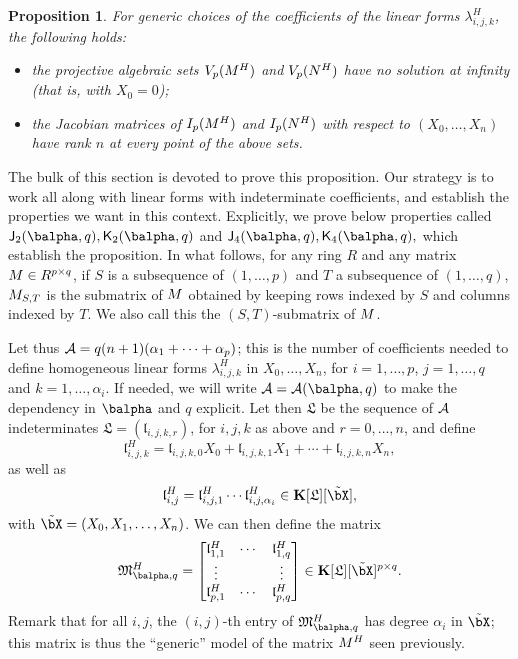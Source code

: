 \documentclass[12pt]{article}
\newtheorem{proposition}[definition]{Proposition}
\begin{document}
\begin{proposition}\label{lemma:appendix}
  For generic choices of the coefficients of the linear forms
  $\lambda^H_{i,j,k}$, the following holds:
  \begin{itemize}
  \item the projective algebraic sets $V_p({M}^H)$ and $V_p({N}^H)$
    have no solution at infinity (that is, with $X_0=0$);
  \item the Jacobian matrices of $I_p({M}^H)$ and $I_p({N}^H)$ with
    respect to $(X_0,\dots,X_n)$ have rank $n$ at every point of the
    above sets.
\end{itemize}
\end{proposition}

The bulk of this section is devoted to prove this proposition.
Our strategy is to work all along with linear forms with indeterminate
coefficients, and establish the properties we want in this context.
Explicitly, we prove below properties called $\assI_2(\balpha,q),\assJ_2(\balpha,q)$
and  $\assI_4(\balpha,q),\assJ_4(\balpha,q),$ which establish the proposition.
In what follows, for any ring $R$ and any matrix ${M} \in R^{p\times
  q}$, if $S$ is a subsequence of $(1,\dots,p)$ and $T$ a subsequence
of $(1,\dots,q)$, ${M}_{S,T}$ is the submatrix of ${M}$ obtained by keeping
rows indexed by $S$ and columns indexed by $T$. We also call this the
$(S,T)$-submatrix of ${M}$.


Let thus ${\cal A}=q(n+1)(\alpha_1 + \cdots + \alpha_p)$; this is the
number of coefficients needed to define homogeneous linear forms
$\lambda^H_{i,j,k}$ in $X_0,\dots,X_n$, for $i=1,\dots,p$,
$j=1,\dots,q$ and $k=1,\dots,\alpha_i$. If needed, we will write
${\cal A}={\cal A}(\balpha,q)$ to make the dependency in $\balpha$ and
$q$ explicit.  Let then $\mathfrak{L}$ be the sequence of ${\cal A}$
indeterminates $\mathfrak{L}=(\mathfrak{l}_{i,j,k,r})$, for $i,j,k$ as
above and $r=0,\dots,n$, and define
$$\mathfrak{l}^H_{i,j,k} = \mathfrak{l}_{i,j,k,0}X_0 + \mathfrak{l}_{i,j,k,1} X_1 +\cdots + \mathfrak{l}_{i,j,k,n} X_n,$$
as well as 
$$\mathfrak{l}^H_{i,j} = \mathfrak{l}^H_{i,j,1} \cdots \mathfrak{l}^H_{i,j,\alpha_i} \in \KK[\mathfrak{L}][\tilde\bX],$$
with $\tilde\bX=(X_0,X_1,\dots,X_n)$. We can then define the
matrix
\begin{align}\label{eq:matM}
\mathfrak{M}^H_{\balpha,q}=\left [\begin{matrix}
\mathfrak{l}^H_{1,1} & \cdots & \mathfrak{l}^H_{1,q}\\
 \vdots & & \vdots\\
\mathfrak{l}^H_{p,1} & \cdots & \mathfrak{l}^H_{p,q}
  \end{matrix}\right ]\in \KK[\mathfrak{L}][\tilde\bX]^{p\times q}.  
\end{align}
Remark that for all $i,j$, the $(i,j)$-th entry of
$\mathfrak{M}^H_{\balpha,q}$ has degree $\alpha_i$ in $\tilde \bX$;
this matrix is thus the ``generic'' model of the matrix ${M}^H$ seen previously.
\end{document}

